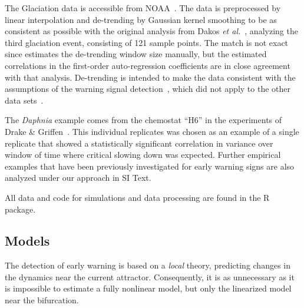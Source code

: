 \documentclass{pnastwo}
\begin{document}
\begin{article}
\begin{materials}
The Glaciation data is accessible from NOAA~\cite{Petit1999}.
The data is preprocessed by linear interpolation and de-trending by Gaussian kernel smoothing 
to be as consistent as possible with the original analysis from Dakos \emph{et al.}~\cite{Dakos2008},
analyzing the third glaciation event, consisting of 121 sample points. 
The match is not exact since estimates the de-trending window size manually,
but the estimated correlations in the first-order auto-regression coefficients are in close agreement with that analysis. 
De-trending is intended to make the data consistent with the assumptions of the warning signal detection~\cite{Dakos2008}, 
which did not apply to the other data sets~\cite{Drake2010}.  

The \emph{Daphnia} example comes from the chemostat ``H6'' in the experiments of Drake \& Griffen~\cite{Drake2010}. 
This individual replicates was chosen as an example of a single replicate 
that showed a statistically significant correlation in variance over window of time where critical slowing down was expected. 
Further empirical examples that have been previously investigated for early warning signs are also analyzed under our approach in SI Text.  

All data and code for simulations and data processing are found in the R package.  

                             \end{materials}

                             \appendix 
                             \subsection{Models}
The detection of early warning is based on a \emph{local} theory,
predicting changes in the dynamics near the current attractor.
Consequently, it is as unnecessary as it is impossible to estimate a fully nonlinear model,
but only the linearized model near the bifurcation.


\end{article}
\end{document}
